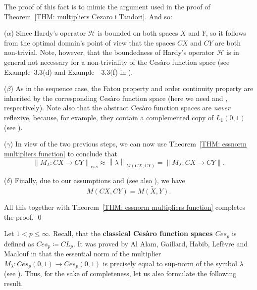 \documentclass[11pt]{amsart}
\theoremstyle{definition}
\theoremstyle{definition}
\theoremstyle{definition}
\theoremstyle{definition}
\theoremstyle{definition}
\theoremstyle{definition}
\theoremstyle{definition}
\theoremstyle{definition}
\numberwithin{equation}{section}
\numberwithin{equation}{section}
\numberwithin{equation}{section}
\theoremstyle{definition}
\theoremstyle{definition}
\theoremstyle{definition}
\theoremstyle{definition}
\theoremstyle{definition}
\theoremstyle{definition}
\newcommand{\norm}[1]{\left\lVert#1\right\rVert}
\renewenvironment{proof}{\noindent {\bf Proof.}}{\qed}
\begin{document}
\begin{proof}
	The proof of this fact is to mimic the argument used in the proof of Theorem~\ref{THM: multipliers Cezaro i Tandori}. And so:
	
		($\alpha$) Since Hardy's operator $\mathscr{H}$ is bounded on both spaces $X$ and $Y$, so it follows from the optimal domain's point of view
		that the spaces $CX$ and $CY$ are both non-trivial. Note, however, that the boundedness of Hardy's operator $\mathscr{H}$ is in general not
		necessary for a non-triviality of the Ces{\` a}ro function space (see Example~3.3(d) and Example~~3.3(f) in \cite{KKM21}).
		
		($\beta$) As in the sequence case, the Fatou property and order continuity property are inherited by the corresponding Ces{\` a}ro function space
		(here we need \cite[Lemma~1(d)]{LM15a} and \cite[Lemma~11]{KT17}, respectively). Note also that the abstract Ces{\` a}ro function spaces
		are {\it never} reflexive, because, for example, they contain a complemented copy of $L_1(0,1)$ (see \cite[Lemma~4.1]{KKM21}).
		
		($\gamma$) In view of the two previous steps, we can now use Theorem~\ref{THM: essnorm multipliers function} to conclude that
		\begin{equation*}
			\norm{M_{\lambda} \colon CX \rightarrow CY}_{ess} \approx \norm{\lambda}_{M(CX,CY)} = \norm{M_{\lambda} \colon CX \rightarrow CY}.
		\end{equation*}
	
		($\delta$) Finally, due to our assumptions and \cite[Theorem~6.a.3]{KT24} (see also \cite[Theorem~6]{KLM19}), we have
		\begin{equation*}
			M(CX,CY) = \widetilde{M(X,Y)}.
		\end{equation*}
	
		All this together with Theorem~\ref{THM: essnorm multipliers function} completes the proof.
\end{proof}

Let $1 < p \leqslant \infty$.
Recall, that the {\bf classical Ces{\` a}ro function spaces $Ces_p$} is defined as $Ces_p \coloneqq CL_p$.
It was proved by Al Alam, Gaillard, Habib, Lef{\` e}vre and Maalouf in \cite{AGHLM18} that the essential norm
of the multiplier $M_{\lambda} \colon Ces_p(0,1) \rightarrow Ces_p(0,1)$ is precisely equal to sup-norm of the symbol $\lambda$ (see \cite[Theorem~5.2]{AGHLM18}).
Thus, for the sake of completeness, let us also formulate the following result.
\end{document}
